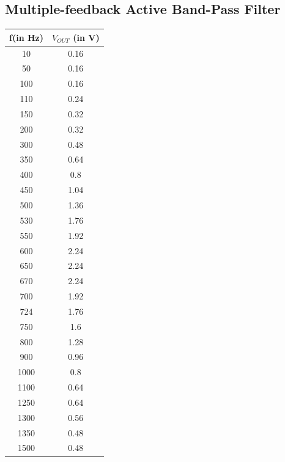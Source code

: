 \documentclass[12pt]{article}
\begin{document}
\subsection{Multiple-feedback Active Band-Pass Filter}
\begin{table}[H]
		\begin{center}
		
		\begin{tabular}{|c|c|}
			\hline
			\textbf{f(in Hz)} & \textbf{$V_{OUT}$ (in V)}\\
			\hline
			10 & 0.16\\
			\hline
			50 & 0.16\\
			\hline
                   100 & 0.16\\
			\hline
                   110 & 0.24\\
			\hline
                   150 & 0.32\\
			\hline
200 & 0.32\\
			\hline
300 & 0.48\\
			\hline
350 & 0.64\\
			\hline
400 & 0.8\\
			\hline
450 & 1.04\\
			\hline
500 & 1.36\\
			\hline
530 & 1.76\\
			\hline
550 & 1.92\\
			\hline
600 & 2.24\\
			\hline
650 & 2.24\\
			\hline
670 & 2.24\\
			\hline
700 & 1.92\\
			\hline
724 & 1.76\\
			\hline
750 & 1.6\\
			\hline
800 & 1.28\\
			\hline
900 & 0.96\\
			\hline
1000 & 0.8\\
			\hline
1100 & 0.64\\
			\hline
1250 & 0.64\\
			\hline
1300 & 0.56\\
			\hline
1350 & 0.48\\
			\hline
1500 & 0.48\\
			\hline

		\end{tabular}
		\end{center}
\end{table}
\end{document}
